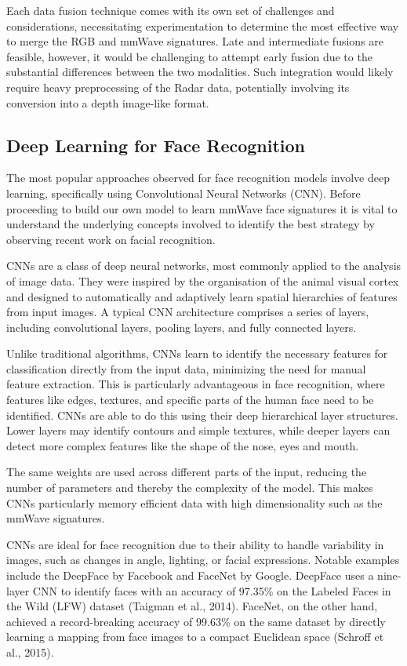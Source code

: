 \documentclass{interim}
\begin{document}
Each data fusion technique comes with its own set of challenges and considerations, necessitating experimentation to determine the most effective way to merge the RGB and mmWave signatures. Late and intermediate fusions are feasible, however, it would be challenging to attempt early fusion due to the substantial differences between the two modalities. Such integration would likely require heavy preprocessing of the Radar data, potentially involving its conversion into a depth image-like format. 


\subsection{Deep Learning for Face Recognition}
The most popular approaches observed for face recognition models involve deep learning, specifically using Convolutional Neural Networks (CNN). Before proceeding to build our own model to learn mmWave face signatures it is vital to understand the underlying concepts involved to identify the best strategy by observing recent work on facial recognition. 

CNNs are a class of deep neural networks, most commonly applied to the analysis of image data. They were inspired by the organisation of the animal visual cortex and designed to automatically and adaptively learn spatial hierarchies of features from input images. A typical CNN architecture comprises a series of layers, including convolutional layers, pooling layers, and fully connected layers.

Unlike traditional algorithms, CNNs learn to identify the necessary features for classification directly from the input data, minimizing the need for manual feature extraction. This is particularly advantageous in face recognition, where features like edges, textures, and specific parts of the human face need to be identified. CNNs are able to do this using their deep hierarchical layer structures. Lower layers may identify contours and simple textures, while deeper layers can detect more complex features like the shape of the nose, eyes and mouth.

The same weights are used across different parts of the input, reducing the number of parameters and thereby the complexity of the model. This makes CNNs particularly memory efficient data with high dimensionality such as the mmWave signatures.

CNNs are ideal for face recognition due to their ability to handle variability in images, such as changes in angle, lighting, or facial expressions. Notable examples include the DeepFace by Facebook and FaceNet by Google. DeepFace uses a nine-layer CNN to identify faces with an accuracy of 97.35\% on the Labeled Faces in the Wild (LFW) dataset (Taigman et al., 2014). FaceNet, on the other hand, achieved a record-breaking accuracy of 99.63\% on the same dataset by directly learning a mapping from face images to a compact Euclidean space (Schroff et al., 2015).
\end{document}
